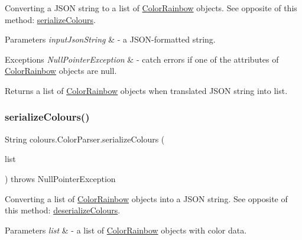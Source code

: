 Converting a J\+S\+ON string to a list of \hyperlink{classcolours_1_1_color_rainbow}{Color\+Rainbow} objects. See opposite of this method\+: \hyperlink{classcolours_1_1_color_parser_a3a8b5f6c8bd9045b63fd8e162f3c96d3}{serialize\+Colours}. 
\begin{DoxyParams}{Parameters}
{\em input\+Json\+String} & -\/ a J\+S\+O\+N-\/formatted string. \\
\hline
\end{DoxyParams}

\begin{DoxyExceptions}{Exceptions}
{\em Null\+Pointer\+Exception} & -\/ catch errors if one of the attributes of \hyperlink{classcolours_1_1_color_rainbow}{Color\+Rainbow} objects are null. \\
\hline
\end{DoxyExceptions}
\begin{DoxyReturn}{Returns}
a list of \hyperlink{classcolours_1_1_color_rainbow}{Color\+Rainbow} objects when translated J\+S\+ON string into list. 
\end{DoxyReturn}
\mbox{\label{classcolours_1_1_color_parser_a3a8b5f6c8bd9045b63fd8e162f3c96d3}} 
\subsubsection{\texorpdfstring{serialize\+Colours()}{serializeColours()}}
{\footnotesize\ttfamily String colours.\+Color\+Parser.\+serialize\+Colours (\begin{DoxyParamCaption}\item[{List$<$ \hyperlink{classcolours_1_1_color_rainbow}{Color\+Rainbow} $>$}]{list }\end{DoxyParamCaption}) throws Null\+Pointer\+Exception\hspace{0.3cm}{\ttfamily [inline]}}

Converting a list of \hyperlink{classcolours_1_1_color_rainbow}{Color\+Rainbow} objects into a J\+S\+ON string. See opposite of this method\+: \hyperlink{classcolours_1_1_color_parser_a1b1dd2f7269dd1fe21a88befb27c4f3f}{deserialize\+Colours}. 
\begin{DoxyParams}{Parameters}
{\em list} & -\/ a list of \hyperlink{classcolours_1_1_color_rainbow}{Color\+Rainbow} objects with color data. \\
\hline
\end{DoxyParams}


